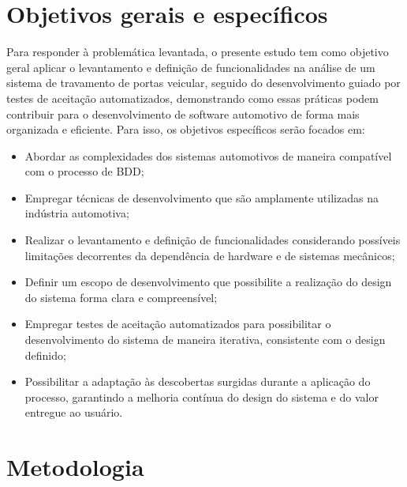 \section{Objetivos gerais e específicos}

Para responder à problemática levantada, o presente estudo tem como objetivo geral aplicar o levantamento e definição de funcionalidades na análise de um sistema de 
travamento de portas veicular, seguido do desenvolvimento guiado por testes de aceitação automatizados, demonstrando como essas práticas podem contribuir para o 
desenvolvimento de software automotivo de forma mais organizada e eficiente.
Para isso, os objetivos específicos serão focados em:
\begin{itemize}
	\item Abordar as complexidades dos sistemas automotivos de maneira compatível com o processo de BDD;
    \item Empregar técnicas de desenvolvimento que são amplamente utilizadas na indústria automotiva;
    \item Realizar o levantamento e definição de funcionalidades considerando possíveis limitações decorrentes da dependência de hardware e de sistemas mecânicos;
    \item Definir um escopo de desenvolvimento que possibilite a realização do design do sistema forma clara e compreensível;
    \item Empregar testes de aceitação automatizados para possibilitar o desenvolvimento do sistema de maneira iterativa, consistente com o design definido;
    \item Possibilitar a adaptação às descobertas surgidas durante a aplicação do processo, garantindo a melhoria contínua do design do sistema e do valor entregue ao usuário.
\end{itemize}

\section{Metodologia}

